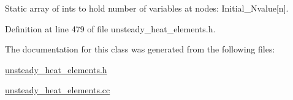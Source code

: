 Static array of ints to hold number of variables at nodes\+: Initial\+\_\+\+Nvalue\mbox{[}n\mbox{]}. 



Definition at line 479 of file unsteady\+\_\+heat\+\_\+elements.\+h.



The documentation for this class was generated from the following files\+:\begin{DoxyCompactItemize}
\item 
\hyperlink{unsteady__heat__elements_8h}{unsteady\+\_\+heat\+\_\+elements.\+h}\item 
\hyperlink{unsteady__heat__elements_8cc}{unsteady\+\_\+heat\+\_\+elements.\+cc}\end{DoxyCompactItemize}
